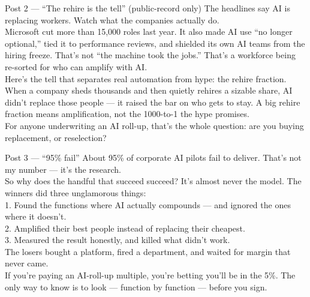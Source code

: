 \documentclass[11pt]{article}
\begin{document}
\begin{copybox}{Post 2 --- ``The rehire is the tell'' (public-record only)}
The headlines say AI is replacing workers. Watch what the companies actually do.\\[3pt]
Microsoft cut more than 15,000 roles last year. It also made AI use ``no longer optional,'' tied
it to performance reviews, and shielded its own AI teams from the hiring freeze. That's not ``the
machine took the jobs.'' That's a workforce being re-sorted for who can amplify with AI.\\[3pt]
Here's the tell that separates real automation from hype: the rehire fraction. When a company
sheds thousands and then quietly rehires a sizable share, AI didn't replace those people --- it
raised the bar on who gets to stay. A big rehire fraction means amplification, not the
1000-to-1 the hype promises.\\[3pt]
For anyone underwriting an AI roll-up, that's the whole question: are you buying replacement, or
reselection?
\end{copybox}

\begin{copybox}{Post 3 --- ``95\% fail''}
About 95\% of corporate AI pilots fail to deliver. That's not my number --- it's the research.\\[3pt]
So why does the handful that succeed succeed? It's almost never the model. The winners did three
unglamorous things:\\[2pt]
1. Found the functions where AI actually compounds --- and ignored the ones where it doesn't.\\
2. Amplified their best people instead of replacing their cheapest.\\
3. Measured the result honestly, and killed what didn't work.\\[3pt]
The losers bought a platform, fired a department, and waited for margin that never came.\\[3pt]
If you're paying an AI-roll-up multiple, you're betting you'll be in the 5\%. The only way to
know is to look --- function by function --- before you sign.
\end{copybox}
\end{document}

